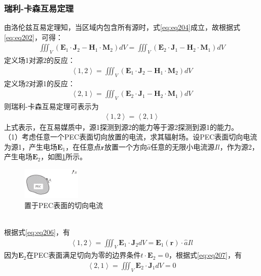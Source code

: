 \documentclass{article}
\numberwithin{equation}{section}
\renewcommand{\vec}[1]{\boldsymbol{#1}}
\begin{document}
\subsubsection{瑞利-卡森互易定理}
由洛伦兹互易定理知，当区域内包含所有源时，式\ref{eq:eq204}成立，故根据式\ref{eq:eq202}，可得\textbf{\color{blue}{瑞利-卡森互易定理}}：
\begin{align}
    \label{eq:eq205}
    \iiint_V(\mathbf{E}_1\cdot\mathbf{J}_2-\mathbf{H}_1\cdot\mathbf{M}_2)dV=\iiint_V(\mathbf{E}_2\cdot\mathbf{J}_1-\mathbf{H}_2\cdot\mathbf{M}_1)dV
\end{align}
定义场1对源2的反应：
\begin{align}
    \label{eq:eq206}
    \left\langle 1,2\right\rangle =\iiint_V(\mathbf{E}_1\cdot\mathbf{J}_2-\mathbf{H}_1\cdot\mathbf{M}_2)dV
\end{align}
定义场2对源1的反应：
\begin{align}
    \label{eq:eq207}
    \left\langle 2,1\right\rangle =\iiint_V(\mathbf{E}_2\cdot\mathbf{J}_1-\mathbf{H}_2\cdot\mathbf{M}_1)dV
\end{align}
则瑞利-卡森互易定理可表示为
\begin{align}
    \label{eq:eq208}
    \left\langle 1,2\right\rangle =\left\langle 2,1\right\rangle
\end{align}
上式表示，在互易媒质中，源1探测到源2的能力等于源2探测到源1的能力。\\
（1）考虑任意一个PEC表面切向放置的电流，求其辐射场。设PEC表面切向电流为源1，产生电场$\mathbf{E}_1$，在任意点$\vec{r}$放置一个方向$\hat{a}$任意的无限小电流源$Il$，作为源2，产生电场$\mathbf{E}_2$，如图\ref{fig:fig12}所示。
\begin{figure}[ht]
    \centering
    \includegraphics[width=0.25\textwidth]{置于PEC表面的切向电流.PNG}
    \caption{置于PEC表面的切向电流}
    \label{fig:fig12}
\end{figure}
\\根据式\ref{eq:eq206}，有
\begin{align}
    \label{eq:eq209}
    \left\langle 1,2\right\rangle =\iiint_V\mathbf{E}_1\cdot\mathbf{J}_2dV=\mathbf{E}_1(\vec{r})\cdot\hat{a}Il
\end{align}
因为$\mathbf{E}_2$在PEC表面满足切向为零的边界条件$\hat{t}\cdot\mathbf{E}_2=0$，根据式\ref{eq:eq207}，有
\begin{align}
    \label{eq:eq210}
    \left\langle 2,1\right\rangle =\iiint_V\mathbf{E}_2\cdot\mathbf{J}_1dV=0
\end{align}
\end{document}

